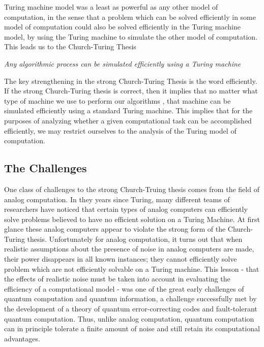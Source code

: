 \documentclass[12pt, oneside]{book}
\theoremstyle{definition}
\theoremstyle{definition}
\theoremstyle{remark}
\begin{document}
Turing machine model was a least as powerful as any other model of computation, in the sense that a problem which can be solved efficiently in some model of computation could also be solved efficiently in the Turing machine model, by using the Turing machine to simulate the other model of computation. This leads us to the Church-Turing Thesis

\textit{Any algorithmic process can be simulated efficiently using a Turing machine}

The key strengthening in the strong Church-Turing Thesis is the word efficiently. If the strong Church-Turing thesis is correct, then it implies that no matter what type of machine we use to perform our algorithms , that machine can be simulated efficiently using a standard Turing machine. This implies that for the purposes of analyzing whether a given computational task can be accomplished efficiently, we may restrict ourselves to the analysis of the Turing model of computation.

\subsection{The Challenges}
One class of challenges to the strong Church-Truing thesis comes from the field of analog computation. In they years since Turing, many different teams of researchers have noticed that certain types of analog computers can efficiently solve problems believed to have no efficient solution on a Turing Machine. At first glance these analog computers appear to violate the strong form of the Church-Turing thesis. Unfortunately for analog computation, it turns out that when realistic assumptions about the presence of noise in analog computers are made, their power disappears in all known instances; they cannot efficiently solve problem which are not efficiently solvable on a Turing machine. This lesson - that the effects of realistic noise must be taken into account in evaluating the efficiency of a computational model - was one of the great early challenges of quantum computation and quantum information, a challenge successfully met by the development of a theory of quantum error-correcting codes and fault-tolerant quantum computation. Thus, unlike analog computation, quantum computation can in principle tolerate a finite amount of noise and still retain its computational advantages.
\end{document}
